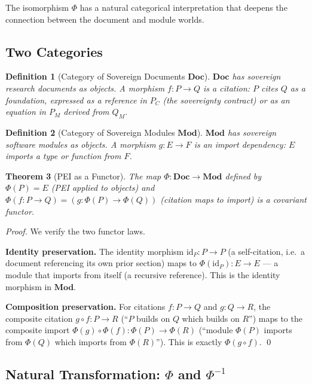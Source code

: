\documentclass[12pt]{article}
\newtheorem{theorem}{Theorem}
\newtheorem{definition}[theorem]{Definition}
\begin{document}
The isomorphism $\Phi$ has a natural categorical interpretation that deepens
the connection between the document and module worlds.

\subsection{Two Categories}

\begin{definition}[Category of Sovereign Documents $\mathbf{Doc}$]
  $\mathbf{Doc}$ has sovereign research documents as objects.  A morphism
  $f : P \to Q$ is a \emph{citation}: $P$ cites $Q$ as a foundation, expressed
  as a reference in $P_C$ (the sovereignty contract) or as an equation in
  $P_M$ derived from $Q_M$.
\end{definition}

\begin{definition}[Category of Sovereign Modules $\mathbf{Mod}$]
  $\mathbf{Mod}$ has sovereign software modules as objects.  A morphism
  $g : E \to F$ is an \emph{import dependency}: $E$ imports a type or function
  from $F$.
\end{definition}

\begin{theorem}[PEI as a Functor]
  The map $\Phi : \mathbf{Doc} \to \mathbf{Mod}$ defined by
  $\Phi(P) = E$ (PEI applied to objects) and
  $\Phi(f : P \to Q) = (g : \Phi(P) \to \Phi(Q))$ (citation maps to import)
  is a covariant functor.
\end{theorem}

\begin{proof}
  We verify the two functor laws.

  \medskip\noindent
  \textbf{Identity preservation.}  The identity morphism $\text{id}_P : P \to P$
  (a self-citation, i.e.\ a document referencing its own prior section) maps to
  $\Phi(\text{id}_P) : E \to E$ — a module that imports from itself (a recursive
  reference).  This is the identity morphism in $\mathbf{Mod}$.

  \medskip\noindent
  \textbf{Composition preservation.}  For citations $f : P \to Q$ and
  $g : Q \to R$, the composite citation $g \circ f : P \to R$ (``$P$ builds on
  $Q$ which builds on $R$'') maps to the composite import
  $\Phi(g) \circ \Phi(f) : \Phi(P) \to \Phi(R)$ (``module $\Phi(P)$ imports
  from $\Phi(Q)$ which imports from $\Phi(R)$'').  This is exactly
  $\Phi(g \circ f)$.  \qed
\end{proof}

\subsection{Natural Transformation: $\Phi$ and $\Phi^{-1}$}
\end{document}
